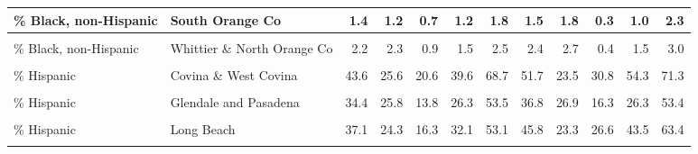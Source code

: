 \begin{table}[!h]
\begin{tabular}[t]{l|>{}l||r|r|r|r|r|r|r|r|r|r}
\hline
\% Black, non-Hispanic & South Orange Co & 1.4 & 1.2 & 0.7 & 1.2 & 1.8 & 1.5 & 1.8 & 0.3 & 1.0 & 2.3\\
\hline
\cellcolor{gray!6}{\% Black, non-Hispanic} & \cellcolor{gray!6}{West Los Angeles \& West Beach} & \cellcolor{gray!6}{6.3} & \cellcolor{gray!6}{11.7} & \cellcolor{gray!6}{1.4} & \cellcolor{gray!6}{2.4} & \cellcolor{gray!6}{4.7} & \cellcolor{gray!6}{5.4} & \cellcolor{gray!6}{8.1} & \cellcolor{gray!6}{1.1} & \cellcolor{gray!6}{2.9} & \cellcolor{gray!6}{6.2}\\
\hline
\% Black, non-Hispanic & Whittier \& North Orange Co & 2.2 & 2.3 & 0.9 & 1.5 & 2.5 & 2.4 & 2.7 & 0.4 & 1.5 & 3.0\\
\hline
\cellcolor{gray!6}{\% Hispanic} & \cellcolor{gray!6}{Anaheim} & \cellcolor{gray!6}{34.0} & \cellcolor{gray!6}{22.0} & \cellcolor{gray!6}{16.3} & \cellcolor{gray!6}{29.7} & \cellcolor{gray!6}{49.1} & \cellcolor{gray!6}{41.3} & \cellcolor{gray!6}{22.7} & \cellcolor{gray!6}{23.1} & \cellcolor{gray!6}{38.6} & \cellcolor{gray!6}{58.1}\\
\hline
\hline
\% Hispanic & Covina \& West Covina & 43.6 & 25.6 & 20.6 & 39.6 & 68.7 & 51.7 & 23.5 & 30.8 & 54.3 & 71.3\\
\hline
\cellcolor{gray!6}{\% Hispanic} & \cellcolor{gray!6}{East Los Angeles} & \cellcolor{gray!6}{66.6} & \cellcolor{gray!6}{27.9} & \cellcolor{gray!6}{41.6} & \cellcolor{gray!6}{77.9} & \cellcolor{gray!6}{91.0} & \cellcolor{gray!6}{64.4} & \cellcolor{gray!6}{28.9} & \cellcolor{gray!6}{36.7} & \cellcolor{gray!6}{73.2} & \cellcolor{gray!6}{91.5}\\
\hline
\% Hispanic & Glendale and Pasadena & 34.4 & 25.8 & 13.8 & 26.3 & 53.5 & 36.8 & 26.9 & 16.3 & 26.3 & 53.4\\
\hline
\cellcolor{gray!6}{\% Hispanic} & \cellcolor{gray!6}{Hollywood \& Wilshire} & \cellcolor{gray!6}{43.7} & \cellcolor{gray!6}{28.3} & \cellcolor{gray!6}{15.8} & \cellcolor{gray!6}{44.4} & \cellcolor{gray!6}{68.5} & \cellcolor{gray!6}{38.2} & \cellcolor{gray!6}{24.6} & \cellcolor{gray!6}{15.7} & \cellcolor{gray!6}{34.7} & \cellcolor{gray!6}{57.1}\\
\hline
\% Hispanic & Long Beach & 37.1 & 24.3 & 16.3 & 32.1 & 53.1 & 45.8 & 23.3 & 26.6 & 43.5 & 63.4\\
\hline
\cellcolor{gray!6}{\% Hispanic} & \cellcolor{gray!6}{Riverside, San Bernardino, \& Ontario} & \cellcolor{gray!6}{38.3} & \cellcolor{gray!6}{20.5} & \cellcolor{gray!6}{21.7} & \cellcolor{gray!6}{34.2} & \cellcolor{gray!6}{52.9} & \cellcolor{gray!6}{53.8} & \cellcolor{gray!6}{22.0} & \cellcolor{gray!6}{36.3} & \cellcolor{gray!6}{54.1} & \cellcolor{gray!6}{72.4}\\

\end{tabular}
\end{table}
